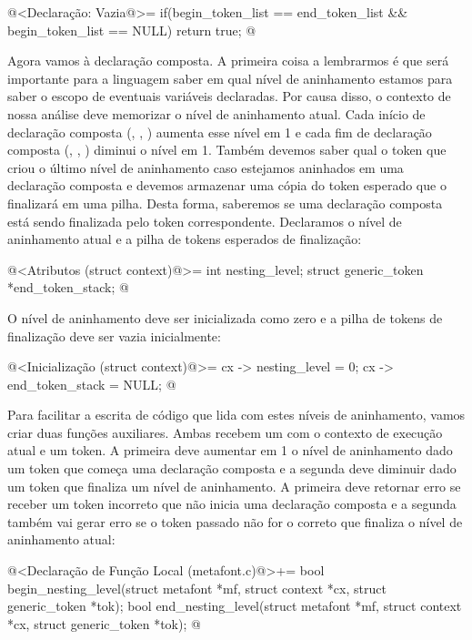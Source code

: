\iniciocodigo
@<Declaração: Vazia@>=
if(begin_token_list == end_token_list && begin_token_list == NULL)
  return true;
@
\fimcodigo

Agora vamos à declaração composta. A primeira coisa a lembrarmos é que
será importante para a linguagem saber em qual nível de aninhamento
estamos para saber o escopo de eventuais variáveis declaradas. Por
causa disso, o contexto de nossa análise deve memorizar o nível de
aninhamento atual. Cada início de declaração composta
(, , )
aumenta esse nível em 1 e cada fim de declaração composta
(, , ) diminui
o nível em 1. Também devemos saber qual o token que criou o último
nível de aninhamento caso estejamos aninhados em uma declaração
composta e devemos armazenar uma cópia do token esperado que o
finalizará em uma pilha. Desta forma, saberemos se uma declaração
composta está sendo finalizada pelo token correspondente. Declaramos o
nível de aninhamento atual e a pilha de tokens esperados de
finalização:

\iniciocodigo
@<Atributos (struct context)@>=
  int nesting_level;
  struct generic_token *end_token_stack;
@
\fimcodigo

O nível de aninhamento deve ser inicializada como zero e a pilha de
tokens de finalização deve ser vazia inicialmente:

\iniciocodigo
@<Inicialização (struct context)@>=
  cx -> nesting_level = 0;
  cx -> end_token_stack = NULL;
@
\fimcodigo

Para facilitar a escrita de código que lida com estes níveis de
aninhamento, vamos criar duas funções auxiliares. Ambas recebem
um  com o contexto de execução atual e um
token. A primeira deve aumentar em 1 o nível de aninhamento dado um
token que começa uma declaração composta e a segunda deve diminuir
dado um token que finaliza um nível de aninhamento. A primeira deve
retornar erro se receber um token incorreto que não inicia uma
declaração composta e a segunda também vai gerar erro se o token
passado não for o correto que finaliza o nível de aninhamento atual:

\iniciocodigo
@<Declaração de Função Local (metafont.c)@>+=
bool begin_nesting_level(struct metafont *mf, struct context *cx,
                         struct generic_token *tok);
bool end_nesting_level(struct metafont *mf, struct context *cx,
                       struct generic_token *tok);
@
\fimcodigo

